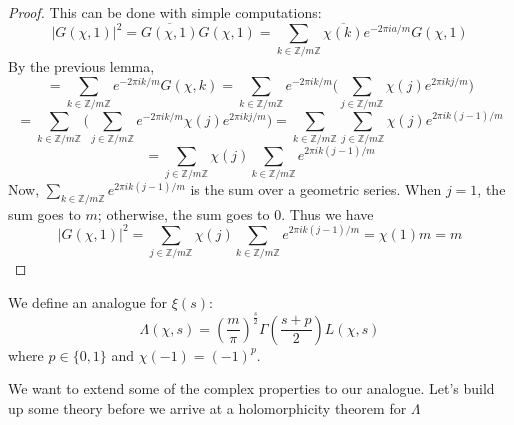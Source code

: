 \begin{proof}
This can be done with simple computations:
\[
    |G(\chi,1)|^2=\overline{G(\chi,1)}G(\chi,1)=\sum_{k\in\mathbb{Z}/m\mathbb{Z}}\overline{\chi(k)}e^{-2\pi ia/m}G(\chi,1)
\]  
By the previous lemma,
\[
    =\sum_{k\in\mathbb{Z}/m\mathbb{Z}}e^{-2\pi i k/m}G(\chi,k)=\sum_{k\in\mathbb{Z}/m\mathbb{Z}}
    e^{-2\pi ik/m}\big(\sum_{j\in\mathbb{Z}/m\mathbb{Z}}\chi(j)e^{2\pi ikj/m}\big)
\]
\[
    =\sum_{k\in\mathbb{Z}/m\mathbb{Z}}\big(\sum_{j\in\mathbb{Z}/m\mathbb{Z}}
    e^{-2\pi ik/m}\chi(j)e^{2\pi ikj/m}\big)
    =\sum_{k\in\mathbb{Z}/m\mathbb{Z}}\sum_{j\in\mathbb{Z}/m\mathbb{Z}}
    \chi(j)e^{2\pi ik(j-1)/m}
\]
\[
    =\sum_{j\in\mathbb{Z}/m\mathbb{Z}}\chi(j)\sum_{k\in\mathbb{Z}/m\mathbb{Z}}e^{2\pi ik(j-1)/m}    
\]
Now, $\sum_{k\in\mathbb{Z}/m\mathbb{Z}}e^{2\pi ik(j-1)/m}$ is the sum over a geometric series.
When $j=1$, the sum goes to $m$; otherwise, the sum goes to $0$. Thus we have
\[
    |G(\chi,1)|^2=\sum_{j\in\mathbb{Z}/m\mathbb{Z}}\chi(j)\sum_{k\in\mathbb{Z}/m\mathbb{Z}}e^{2\pi ik(j-1)/m}
    =\chi(1)m=m
\]
\end{proof}

\begin{definition}
    We define an analogue for $\xi(s)$:
    \[\Lambda(\chi,s)=(\frac{m}{\pi})^{\frac{s}{2}}\Gamma(\frac{s+p}{2})L(\chi,s)\]
    where $p\in \{0,1\}$ and $\chi(-1)=(-1)^p$.
\end{definition}

We want to extend some of the complex properties to our analogue. Let's
build up some theory before we arrive at a holomorphicity theorem for $\Lambda$

